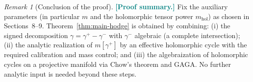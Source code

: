 \documentclass[11pt]{article}
\newcommand{\REVMZ}[1]{\textcolor{teal}{#1}}  %
\numberwithin{equation}{section}  %
\theoremstyle{plain}
\theoremstyle{definition}
\theoremstyle{remark}
\newtheorem{remark}[theorem]{Remark}
\newcommand{\mhol}{m_{\mathrm{hol}}} %
\begin{document}
\begin{remark}[Conclusion of the proof]\label{rem:hodge-final-remark}
\REVMZ{\textbf{[Proof summary.]}}
Fix the auxiliary parameters (in particular $m$ and the holomorphic tensor power $\mhol$) as chosen in Sections~8--9.
Theorem~\ref{thm:main-hodge} is obtained by combining:
(i) the signed decomposition $\gamma=\gamma^{+}-\gamma^{-}$ with $\gamma^{-}$ algebraic (a complete intersection);
(ii) the analytic realization of $m[\gamma^{+}]$ by an effective holomorphic cycle with the required calibration and mass control; and
(iii) the algebraization of holomorphic cycles on a projective manifold via Chow's theorem and GAGA.
No further analytic input is needed beyond these steps.
\end{remark}
\end{document}
